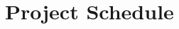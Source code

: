 \documentclass[colorlinks=true,pdfstartview=FitV,linkcolor=blue,
            citecolor=red,urlcolor=magenta]{ligodoc}
\begin{document}
\section{Project Schedule}


\end{document}
